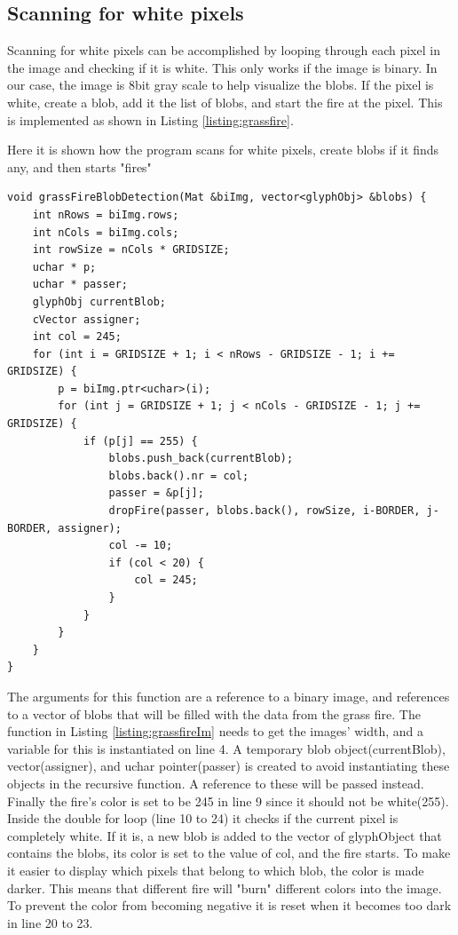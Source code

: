 \subsection{Scanning for white pixels}
Scanning for white pixels can be accomplished by looping through each pixel in the image and checking if it is white. This only works if the image is binary. In our case, the image is 8bit gray scale to help visualize the blobs. If the pixel is white, create a blob, add it the list of blobs, and start the fire at the pixel. This is implemented as shown in Listing \autoref{listing:grassfire}.
\begin{listing}[H]
	\caption{Here it is shown how the program scans for white pixels, create blobs if it finds any, and then starts "fires"}
	\begin{verbatim}
void grassFireBlobDetection(Mat &biImg, vector<glyphObj> &blobs) {
	int nRows = biImg.rows;
	int nCols = biImg.cols;
	int rowSize = nCols * GRIDSIZE;
	uchar * p;
	uchar * passer;
	glyphObj currentBlob;
	cVector assigner;
	int col = 245;
	for (int i = GRIDSIZE + 1; i < nRows - GRIDSIZE - 1; i += GRIDSIZE) {
		p = biImg.ptr<uchar>(i);
		for (int j = GRIDSIZE + 1; j < nCols - GRIDSIZE - 1; j += GRIDSIZE) {
			if (p[j] == 255) {
				blobs.push_back(currentBlob);
				blobs.back().nr = col;
				passer = &p[j];
				dropFire(passer, blobs.back(), rowSize, i-BORDER, j-BORDER, assigner);
				col -= 10;
				if (col < 20) {
					col = 245;
				}
			}
		}
	}
}
	\end{verbatim}
	\label{listing:grassfire}
\end{listing}
The arguments for this function are a reference to a binary image, and references to a vector of blobs that will be filled with the data from the grass fire. The  function in Listing \ref{listing:grassfireIm} needs to get the images' width, and a variable for this is instantiated on line 4. A temporary blob object(currentBlob), vector(assigner), and uchar pointer(passer) is created to avoid instantiating these objects in the recursive function. A reference to these will be passed instead. Finally the fire's color is set to be 245 in line 9 since it should not be white(255). Inside the double for loop (line 10 to 24) it checks if the current pixel is completely white. If it is, a new blob is added to the vector of glyphObject that contains the blobs, its color is set to the value of col, and the fire starts. To make it easier to display which pixels that belong to which blob, the color is made darker. This means that different fire will "burn" different colors into the image. To prevent the color from becoming negative it is reset when it becomes too dark in line 20 to 23.\\
